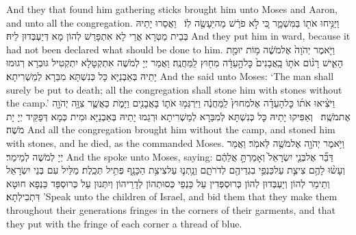 {And they that found him gathering sticks brought him unto Moses and Aaron, and unto all the congregation.}{}
{וַיַּנִּ֥יחוּ אֹת֖וֹ בַּמִּשְׁמָ֑ר כִּ֚י לֹ֣א פֹרַ֔שׁ מַה\maqqaf יֵּעָשֶׂ֖ה לֽוֹ׃ \setuma }
{וַאֲסַרוּ יָתֵיהּ בְּבֵית מַטְּרָא אֲרֵי לָא אִתְפָּרַשׁ לְהוֹן מָא דְּיַעְבְּדוּן לֵיהּ׃}
{And they put him in ward, because it had not been declared what should be done to him.}{}
{וַיֹּ֤אמֶר יְהֹוָה֙ אֶל\maqqaf מֹשֶׁ֔ה מ֥וֹת יוּמַ֖ת הָאִ֑ישׁ רָג֨וֹם אֹת֤וֹ בָֽאֲבָנִים֙ כׇּל\maqqaf הָ֣עֵדָ֔ה מִח֖וּץ לַֽמַּחֲנֶֽה׃}
{וַאֲמַר יְיָ לְמֹשֶׁה אִתְקְטָלָא יִתְקְטִיל גּוּבְרָא רְגוּמוּ יָתֵיהּ בְּאַבְנַיָּא כָּל כְּנִשְׁתָּא מִבַּרָא לְמַשְׁרִיתָא׃}
{And the \lord\space said unto Moses: ‘The man shall surely be put to death; all the congregation shall stone him with stones without the camp.’}{}
{וַיֹּצִ֨יאוּ אֹת֜וֹ כׇּל\maqqaf הָעֵדָ֗ה אֶל\maqqaf מִחוּץ֙ לַֽמַּחֲנֶ֔ה וַיִּרְגְּמ֥וּ אֹת֛וֹ בָּאֲבָנִ֖ים וַיָּמֹ֑ת כַּאֲשֶׁ֛ר צִוָּ֥ה יְהֹוָ֖ה אֶת\maqqaf מֹשֶֽׁה׃ \petucha }
{וְאַפִּיקוּ יָתֵיהּ כָּל כְּנִשְׁתָּא לְמִבַּרָא לְמַשְׁרִיתָא וּרְגַמוּ יָתֵיהּ בְּאַבְנַיָּא וּמִית כְּמָא דְּפַקֵּיד יְיָ יָת מֹשֶׁה׃}
{And all the congregation brought him without the camp, and stoned him with stones, and he died, as the \lord\space commanded Moses.}{}
{וַיֹּ֥אמֶר יְהֹוָ֖ה אֶל\maqqaf מֹשֶׁ֥ה לֵּאמֹֽר׃}
{וַאֲמַר יְיָ לְמֹשֶׁה לְמֵימַר׃}
{And the \lord\space spoke unto Moses, saying:}{}
{דַּבֵּ֞ר אֶל\maqqaf בְּנֵ֤י יִשְׂרָאֵל֙ וְאָמַרְתָּ֣ אֲלֵהֶ֔ם וְעָשׂ֨וּ לָהֶ֥ם צִיצִ֛ת עַל\maqqaf כַּנְפֵ֥י בִגְדֵיהֶ֖ם לְדֹרֹתָ֑ם וְנָ֥תְנ֛וּ עַל\maqqaf צִיצִ֥ת הַכָּנָ֖ף פְּתִ֥יל תְּכֵֽלֶת׃}
{מַלֵּיל עִם בְּנֵי יִשְׂרָאֵל וְתֵימַר לְהוֹן וְיַעְבְּדוּן לְהוֹן כְּרוּסְפְּדִין עַל כַּנְפֵי כְּסוּתְהוֹן לְדָרֵיהוֹן וְיִתְּנוּן עַל כְּרוּסְפַּד כַּנְפָא חוּטָא דִּתְכִילְתָא׃}
{’Speak unto the children of Israel, and bid them that they make them throughout their generations fringes in the corners of their garments, and that they put with the fringe of each corner a thread of blue.}{}
